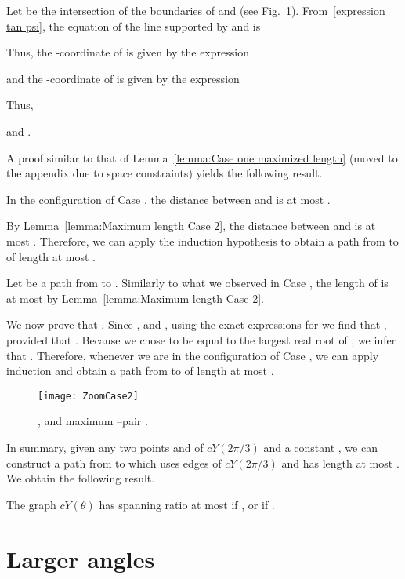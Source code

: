 \documentclass{cccg14}
\newcommand{\cyao}{\ensuremath{cY(\theta)}\xspace}
\newcommand{\cyaoOneTwenty}{\ensuremath{cY(2\pi/3)}\xspace}
\begin{document}
Let  be the intersection of the boundaries of  and 
(see Fig.~\ref{fig:Zoom Case 2}).
From~\eqref{expression tan psi},
the equation of the line supported by  and  is

Thus,
the -coordinate of  is given by the expression

and the -coordinate of  is given by the expression

Thus,

and .

A proof similar to that of Lemma~\ref{lemma:Case one maximized length} (moved to the appendix due to space constraints) yields the following result. \begin{lemma}\label{lemma:Maximum length Case 2}
In the configuration of Case , the distance between  and  is at most .
\end{lemma}

By Lemma~\ref{lemma:Maximum length Case 2}, the distance between  and  is at most . Therefore, we can apply the induction hypothesis to obtain a path  from  to  of length at most .


Let  be a path from  to . 
Similarly to what we observed in Case ,
the length of  is at most  by Lemma~\ref{lemma:Maximum length Case 2}.

We now prove that .
Since ,  and , using the exact expressions for 
we find that ,
provided that .
Because we chose   to be equal to the largest real root of , we infer that .
Therefore,
whenever we are in the configuration of Case ,
we can apply induction and obtain a path  from  to  of length at most .

\begin{figure}[b]\centering
\texttt{[image: ZoomCase2]}
\caption{\small ,  and maximum --pair .}
\label{fig:Zoom Case 2}
\end{figure}


In summary,
given any two points  and  of \cyaoOneTwenty and a constant ,
we can construct a path from  to  which uses edges of \cyaoOneTwenty and has length at most . We obtain the following result.

\vspace{-0.3em}
\begin{theorem}
 \label{thm:contyao}
 The graph  \cyao has spanning ratio at most  if , or  if .
\end{theorem}

\vspace{-1.5em}
\section{Larger angles}\label{Section:Other angles}
\end{document}
